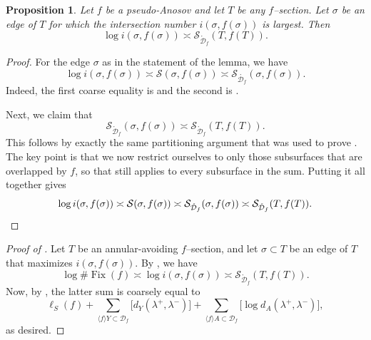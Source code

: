 \documentclass[11pt,letterpaper]{amsart}
\newcommand{\mc}{\mathcal}
\newcommand{\mr}{\mathring}
\newcommand{\Fix}{\operatorname{Fix}}
\numberwithin{equation}{section}
\newtheorem{proposition}[theorem]{Proposition}
\theoremstyle{definition}
\begin{document}
\begin{proposition}\label{Prop:FromTriangToEdgeWR}
Let $f$ be a pseudo-Anosov and let $T$ be any $f$--section. Let $\sigma$ be an edge of $T$ for which the intersection number $i(\sigma, f(\sigma))$ is largest. Then
\[
\log i(\sigma, f(\sigma)) \asymp \mc S_{\mr {\mc D}_f}(T, f(T)).
\]
\end{proposition}

\begin{proof}
For the edge $\sigma$ as in the statement of the lemma, we have
\[
\log i(\sigma, f(\sigma)) \asymp \mc S(\sigma, f(\sigma)) \asymp \mc S_{\mr{\mc D_f}}(\sigma, f(\sigma)).
\]
Indeed, the first coarse equality is  and the second  is .

Next, we claim that
\[
\mc S_{\mr{\mc D}_f}(\sigma, f(\sigma)) \asymp \mc S_{\mr {\mc D}_f}(T, f(T)). 
\]
This follows by exactly the same partitioning argument that was used to prove
 . The key point is that we now restrict ourselves to only those subsurfaces that are overlapped by $f$, so that  still applies to every subsurface in the sum. Putting it all together gives
 \[
\log i(\sigma, f(\sigma)) \asymp \mc S(\sigma, f(\sigma)) \asymp \mc S_{\mr{\mc D}_f}(\sigma, f(\sigma)) \asymp \mc S_{\mr {\mc D}_f}(T, f(T)). \qedhere
 \]
\end{proof}



\begin{proof}[Proof of ]
Let $T$ be an annular-avoiding $f$--section, and let $\sigma \subset T$ be an edge of $T$ that maximizes $i(\sigma, f(\sigma))$. By , we have
\[
\log \# \Fix(f) \asymp \log i(\sigma, f(\sigma))  \asymp \mc S_{\mr {\mc D}_f}(T, f(T)).
\]
Now, by , the latter sum is coarsely equal to 
\[
\ell_{S}(f) + \sum_{\langle f \rangle Y \subset {\mc D}_f} \big[ d_Y(\lambda^+,\lambda^-) \big] + \sum_{\langle f \rangle A \subset {\mc D}_f} \big[ \log d_A(\lambda^+,\lambda^-) \big],
\]
as desired.
\end{proof}


\end{document}
